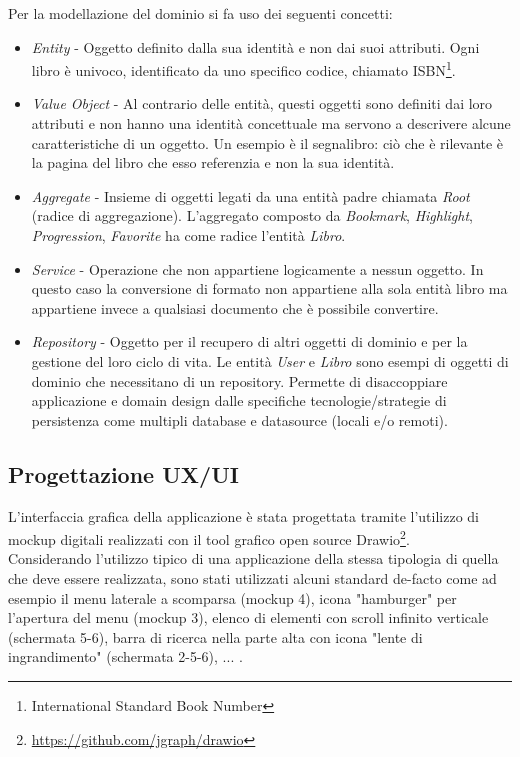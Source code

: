 Per la modellazione del dominio si fa uso dei seguenti concetti\cite{evans_domain-driven_2004}:
\begin{itemize}
    \item \textit{Entity} - Oggetto definito dalla sua identità e non dai suoi attributi. Ogni libro è univoco, identificato da uno specifico codice, chiamato ISBN\footnote{International Standard Book Number}.
    \item \textit{Value Object} - Al contrario delle entità, questi oggetti sono definiti dai loro attributi e non hanno una identità concettuale ma servono a descrivere alcune caratteristiche di un oggetto. Un esempio è il segnalibro: ciò che è rilevante è la pagina del libro che esso referenzia e non la sua identità.
    \item \textit{Aggregate} - Insieme di oggetti legati da una entità padre chiamata \textit{Root} (radice di aggregazione). L'aggregato composto da \textit{Bookmark}, \textit{Highlight}, \textit{Progression}, \textit{Favorite} ha come radice l'entità \textit{Libro}.
    \item \textit{Service} - Operazione che non appartiene logicamente a nessun oggetto. In questo caso la conversione di formato non appartiene alla sola entità libro ma appartiene invece a qualsiasi documento che è possibile convertire.
    \item \textit{Repository} - Oggetto per il recupero di altri oggetti di dominio e per la gestione del loro ciclo di vita. Le entità \textit{User} e \textit{Libro} sono esempi di oggetti di dominio che necessitano di un repository. Permette di disaccoppiare applicazione e domain design dalle specifiche tecnologie/strategie di persistenza come multipli database e datasource (locali e/o remoti).
\end{itemize}

\subsection{Progettazione UX/UI}

L'interfaccia grafica della applicazione è stata progettata tramite l'utilizzo di mockup digitali realizzati con il tool grafico open source Drawio\footnote{\url{https://github.com/jgraph/drawio}}.\\
Considerando l'utilizzo tipico di una applicazione della stessa tipologia di quella che deve essere realizzata, sono stati utilizzati alcuni standard de-facto come ad esempio il menu laterale a scomparsa (mockup 4), icona "hamburger" per l'apertura del menu (mockup 3), elenco di elementi con scroll infinito verticale (schermata 5-6), barra di ricerca nella parte alta con icona "lente di ingrandimento" (schermata 2-5-6), ... .


